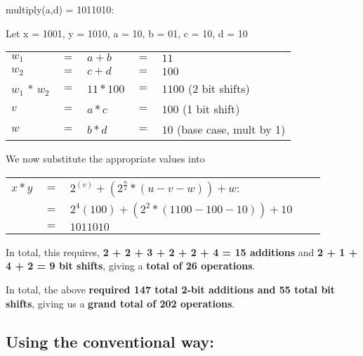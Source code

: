 \documentclass{article}
\begin{document}
multiply(a,d) = 1011010:
\begin{center}
	Let x = 1001, y = 1010, a = 10, b = 01, c = 10, d = 10 \\
	\begin{tabular}{l l l l l}
		\\$w_1$ 	  &$=$ &$a + b$ 	&$=$ &$11$\\
		$w_2$   	  &$=$ &$c + d$ 	&$=$ &$100$ \\
		$w_1$ * $w_2$ &$=$ &$11 * 100$  &$=$ &$1100$ (2 bit shifts) \\
		$v$ 		  &$=$ &$a*c$  		&$=$ &$100$ (1 bit shift)\\
		$w$ 		  &$=$ &$b*d$  		&$=$ &$10$ (base case, mult by 1)\\
	\end{tabular}
\end{center}
We now substitute the appropriate values into \\
\begin{center}
	\begin{tabular}{l l l l l} 
		$x*y$ &$=$  &$2^(v) + (2^{\frac{n}{2}}* (u-v-w)) + w$: \\
			 &$=$  &$2^4(100) + (2^2 * (1100 - 100 - 10)) + 10$ \\
		 	 &$=$  &$1011010$ \\
	\end{tabular}			
\end{center}
In total, this requires, \textbf{2 + 2 + 3 + 2 + 2 + 4 = 15 additions} and \textbf{2 + 1 + 4 + 2 = 9 bit shifts}, giving a \textbf{total of 26 operations}.

In total, the above \textbf{required 147 total 2-bit additions and 55 total bit shifts}, giving us a \textbf{grand total of 202 operations}. 

\subsection*{Using the conventional way:}
\end{document}
